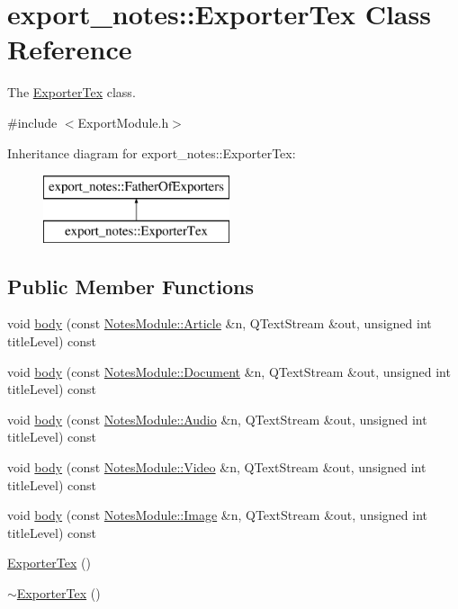\hypertarget{classexport__notes_1_1_exporter_tex}{\section{export\-\_\-notes\-:\-:Exporter\-Tex Class Reference}
\label{classexport__notes_1_1_exporter_tex}
}


The \hyperlink{classexport__notes_1_1_exporter_tex}{Exporter\-Tex} class.  




{\ttfamily \#include $<$Export\-Module.\-h$>$}

Inheritance diagram for export\-\_\-notes\-:\-:Exporter\-Tex\-:\begin{figure}[H]
\begin{center}
\leavevmode
\includegraphics[height=2.000000cm]{classexport__notes_1_1_exporter_tex}
\end{center}
\end{figure}
\subsection*{Public Member Functions}
\begin{DoxyCompactItemize}
\item 
void \hyperlink{classexport__notes_1_1_exporter_tex_ae2d38017e3b033cbdcfc658f95f53c79}{body} (const \hyperlink{class_notes_module_1_1_article}{Notes\-Module\-::\-Article} \&n, Q\-Text\-Stream \&out, unsigned int title\-Level) const 
\item 
void \hyperlink{classexport__notes_1_1_exporter_tex_ad1a12b1bade92330436d233da061b277}{body} (const \hyperlink{class_notes_module_1_1_document}{Notes\-Module\-::\-Document} \&n, Q\-Text\-Stream \&out, unsigned int title\-Level) const 
\item 
void \hyperlink{classexport__notes_1_1_exporter_tex_a9b3f12f291899cd18baf92296ee5c0eb}{body} (const \hyperlink{class_notes_module_1_1_audio}{Notes\-Module\-::\-Audio} \&n, Q\-Text\-Stream \&out, unsigned int title\-Level) const 
\item 
void \hyperlink{classexport__notes_1_1_exporter_tex_a713718cfac5a3984af2146a0174466ca}{body} (const \hyperlink{class_notes_module_1_1_video}{Notes\-Module\-::\-Video} \&n, Q\-Text\-Stream \&out, unsigned int title\-Level) const 
\item 
void \hyperlink{classexport__notes_1_1_exporter_tex_a81b0fcd730e17a93a5242105b75efaff}{body} (const \hyperlink{class_notes_module_1_1_image}{Notes\-Module\-::\-Image} \&n, Q\-Text\-Stream \&out, unsigned int title\-Level) const 
\item 
\hyperlink{classexport__notes_1_1_exporter_tex_aa855c8f9f2db8daad7be178856e4a301}{Exporter\-Tex} ()
\item 
\hyperlink{classexport__notes_1_1_exporter_tex_a0b92751492daa3028813b03bb1c4ab84}{$\sim$\-Exporter\-Tex} ()
\end{DoxyCompactItemize}


